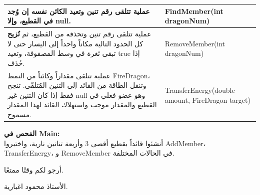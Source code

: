\documentclass[14pt]{extarticle}
\begin{document}
\begin{enumerate}[label=\textbf{تمرين \arabic*:}, wide=0pt, leftmargin=*, itemsep=2.2em]
{\begin{tabular}{|>{\raggedleft\arraybackslash}p{}|>{\raggedright\arraybackslash}p{}|}
    عملية تتلقى رقم تنين وتعيد الكائن نفسه إن وُجد في القطيع، وإلا \textenglish{null}. & \textenglish{FindMember(int dragonNum)} \\
    \hline
    عملية تتلقى رقم تنين وتحذفه من القطيع، ثم \textbf{تُزيح} كل الحدود التالية مكاناً واحداً إلى اليسار حتى لا تبقى ثغرة في وسط المصفوفة، وتعيد \textenglish{true} إذا حُذف. & \textenglish{RemoveMember(int dragonNum)} \\
    \hline
    عملية تتلقى مقداراً وكائناً من النمط \textenglish{FireDragon}، وتنقل الطاقة من القائد إلى التنين المُتلقّى. تنجح فقط إذا كان التنين غير \textenglish{null} وهو عضو فعلي في القطيع والمقدار موجب واستهلاك القائد لهذا المقدار مسموح. & \textenglish{TransferEnergy(double amount, FireDragon target)} \\
    \hline
    \end{tabular}
    \par} %

    \vspace{2em}
    \noindent \textbf{الفحص في \textenglish{Main}:} \\
    أنشئوا قائداً بقطيع أقصى $3$ وأربعة تنانين نارية، واختبروا \textenglish{AddMember}، \textenglish{TransferEnergy}، و \textenglish{RemoveMember} في الحالات المختلفة.

\end{enumerate}

\vspace{1cm}
\begin{flushleft}
أرجو لكم وقتًا ممتعًا.

الأستاذ محمود اغبارية.
\end{flushleft}
\end{document}
